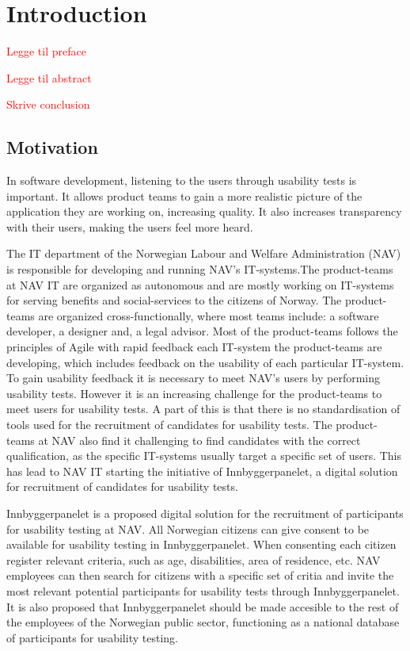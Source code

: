 \section{Introduction}

\textcolor{red}{Legge til preface}

\textcolor{red}{Legge til abstract}

\textcolor{red}{Skrive conclusion}

\subsection{Motivation}
In software development, listening to the users through usability tests is important. It allows product teams to gain a more realistic picture of the application they are working on, increasing quality. It also increases transparency with their users, making the users feel more heard. 

The IT department of the Norwegian Labour and Welfare Administration (NAV) is responsible for developing and running NAV's IT-systems.The product-teams at NAV IT are organized as autonomous and are mostly working on IT-systems for serving benefits and social-services to the citizens of Norway. The product-teams are organized cross-functionally, where most teams include: a software developer, a designer and, a legal advisor. Most of the product-teams follows the principles of Agile with rapid feedback each IT-system the product-teams are developing, which includes feedback on the usability of each particular IT-system. To gain usability feedback it is necessary to meet NAV's users by performing usability tests. However it is an increasing challenge for the product-teams to meet users for usability tests. A part of this is that there is no standardisation of tools used for the recruitment of candidates for usability tests. The product-teams at NAV also find it challenging to find candidates with the correct qualification, as the specific IT-systems usually target a specific set of users. This has lead to NAV IT starting the initiative of Innbyggerpanelet, a digital solution for recruitment of candidates for usability tests.

Innbyggerpanelet is a proposed digital solution for the recruitment of participants for usability testing at NAV. All Norwegian citizens can give consent to be available for usability testing in Innbyggerpanelet. When consenting each citizen register relevant criteria, such as age, disabilities, area of residence, etc. NAV employees can then search for citizens with a specific set of critia and invite the most relevant potential participants for usability tests through Innbyggerpanelet. It is also proposed that Innbyggerpanelet should be made accesible to the rest of the employees of the Norwegian public sector, functioning as a national database of participants for usability testing.

